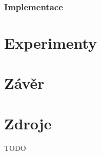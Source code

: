 \documentclass[a4paper, 12pt, titlepage, final]{article}[3. prosinec 2011]
\begin{document}
\subsubsection*{Implementace}

\section{Experimenty}

\section{Závěr}

\section{Zdroje}

TODO


\end{document}
